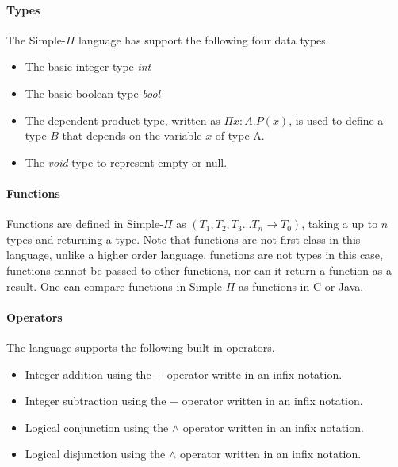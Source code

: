 \documentclass[a4paper,12pt]{report}
\begin{document}
\paragraph{Types} The Simple-$\Pi$ language has support the following four data types. 
\begin{itemize}
  \item The basic integer type \textit{int}
  \item The basic boolean type \textit{bool}
  \item The dependent product type, written as $\Pi x: A.P(x)$, is used to 
  define a type $B$ that depends on the variable $x$ of type A.
  \item The \textit{void} type to represent empty or null.
\end{itemize}

\paragraph{Functions}
Functions are defined in Simple-$\Pi$ as $(T_1, T_2,T_3...T_n \longrightarrow T_0)$, 
taking a up to $n$ types and returning a type. Note that functions are 
not first-class in this language, unlike a higher order 
language, functions are not types in this case, functions cannot be passed to 
other functions, nor can it return a function as a result. One can compare 
functions in Simple-$\Pi$ as functions in C or Java. 

\paragraph{Operators}
The language supports the following built in operators.
\begin{itemize}
  \item Integer addition using the $+$ operator writte in an infix notation.
  \item Integer subtraction using the $-$ operator written in an infix notation.
  \item Logical conjunction using the $\wedge$ operator written in an infix 
  notation.
  \item Logical disjunction using the $\wedge$ operator written in an infix 
  notation.
\end{itemize}
\end{document}
